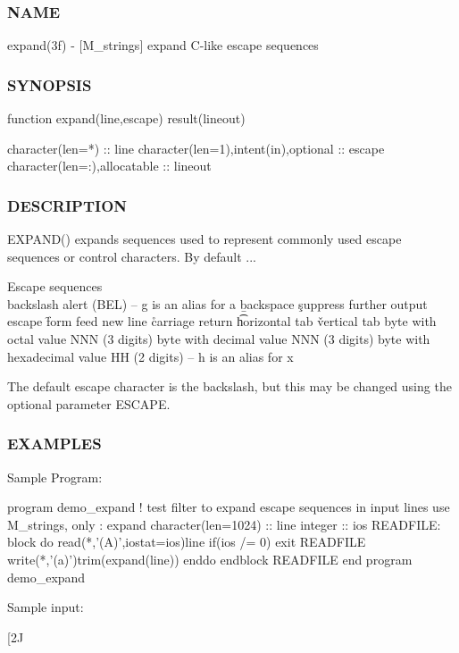 \subsubsection*{N\+A\+ME}

expand(3f) -\/ \mbox{[}M\+\_\+strings\mbox{]} expand C-\/like escape sequences 

\subsubsection*{S\+Y\+N\+O\+P\+S\+IS}

\begin{DoxyVerb}function expand(line,escape) result(lineout)

 character(len=*)                      :: line
 character(len=1),intent(in),optional  :: escape
 character(len=:),allocatable          :: lineout
\end{DoxyVerb}
 \subsubsection*{D\+E\+S\+C\+R\+I\+P\+T\+I\+ON}

\begin{DoxyVerb} EXPAND() expands sequences used to represent commonly used escape sequences
 or control characters. By default ...

 Escape sequences
   \\     backslash
   \a     alert (BEL) -- g is an alias for a
   \b     backspace
   \c     suppress further output
   \e     escape
   \f     form feed
   \n     new line
   \r     carriage return
   \t     horizontal tab
   \v     vertical tab
   \oNNN  byte with octal value NNN (3 digits)
   \dNNN  byte with decimal value NNN (3 digits)
   \xHH   byte with hexadecimal value HH (2 digits) -- h is an alias for x

 The default escape character is the backslash, but this may be changed using
 the optional parameter ESCAPE.
\end{DoxyVerb}


\subsubsection*{E\+X\+A\+M\+P\+L\+ES}

\begin{DoxyVerb}Sample Program:

 program demo_expand
 !  test filter to expand escape sequences in input lines
 use M_strings, only : expand
 character(len=1024) :: line
 integer             :: ios
    READFILE: block
       do
          read(*,'(A)',iostat=ios)line
          if(ios /= 0) exit READFILE
          write(*,'(a)')trim(expand(line))
       enddo
    endblock READFILE
 end program demo_expand

Sample input:

  \e[2J
  \tABC\tabc
  \tA\a
  \nONE\nTWO\nTHREE \end{DoxyVerb}
 \mbox{\label{namespacem__strings_abf6c760f5d15a306bd252337d0a5ba4d}} 
